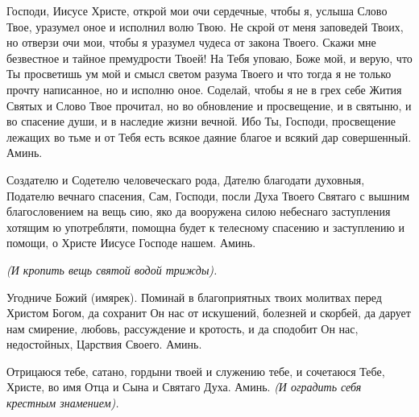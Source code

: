  



Господи, Иисусе Христе, открой мои очи сердечные, чтобы я, услыша Слово Твое, уразумел оное и исполнил волю Твою. Не скрой от меня заповедей Твоих, но отверзи очи мои, чтобы я уразумел чудеса от закона Твоего. Скажи мне безвестное и тайное премудрости Твоей! На Тебя уповаю, Боже мой, и верую, что Ты просветишь ум мой и смысл светом разума Твоего и что тогда я не только прочту написанное, но и исполню оное. Соделай, чтобы я не в грех себе Жития Святых и Слово Твое прочитал, но во обновление и просвещение, и в святыню, и во спасение души, и в наследие жизни вечной. Ибо Ты, Господи, просвещение лежащих во тьме и от Тебя есть всякое даяние благое и всякий дар совершенный. Аминь.
\nopagebreak\bigskip\bigskip\mychapterending

 



Создателю и Содетелю человеческаго рода, Дателю благодати духовныя, Подателю вечнаго спасения, Сам, Господи, посли Духа Твоего Святаго с вышним благословением на вещь сию, яко да вооружена силою небеснаго заступления хотящим ю употребляти, помощна будет к телесному спасению и заступлению и помощи, о Христе Иисусе Господе нашем. Аминь. 


\itshape (И кропить вещь святой водой трижды).\normalfont{}


 
\nopagebreak\bigskip\bigskip\mychapterending

 


Угодниче Божий (имярек). Поминай в благоприятных твоих молитвах перед Христом Богом, да сохранит Он нас от искушений, болезней и скорбей, да дарует нам смирение, любовь, рассуждение и кротость, и да сподобит Он нас, недостойных, Царствия Своего. Аминь.



\nopagebreak\bigskip\bigskip\mychapterending

 




Отрицаюся тебе, сатано, гордыни твоей и служению тебе, и сочетаюся Тебе, Христе, во имя Отца и Сына и Святаго Духа. Аминь. \itshape (И оградить себя крестным знамением).\normalfont{}



